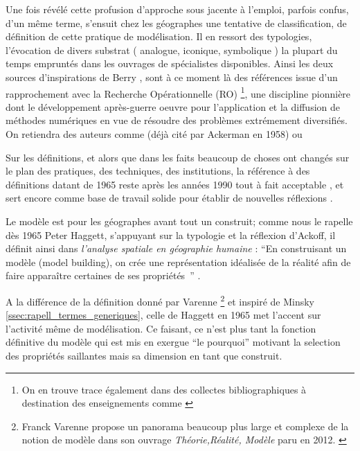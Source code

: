 Une fois révélé cette profusion d'approche sous jacente à l'emploi, parfois confus, d'un même terme, s'ensuit chez les géographes une tentative de classification, de définition de cette pratique de modélisation. Il en ressort des typologies, l'évocation de divers substrat ( analogue, iconique, symbolique ) la plupart du temps empruntés dans les ouvrages de spécialistes disponibles. Ainsi les deux sources d'inspirations de Berry \autocite[106]{Berry1963}, \autocite{Haggett1965} sont à ce moment là des références issue d'un rapprochement avec la Recherche Opérationnelle (RO) \footnote{On en trouve trace également dans des collectes bibliographiques à destination des enseignements comme \autocite{Greer1972}}, une discipline pionnière dont le développement après-guerre oeuvre pour l'application et la diffusion de méthodes numériques en vue de résoudre des problèmes extrémement diversifiés. On retiendra des auteurs comme \textcite{Ackoff1962} (déjà cité par Ackerman en 1958) ou \textcite{Kemeny1962}


Sur les définitions, et alors que dans les faits beaucoup de choses ont changés sur le plan des pratiques, des techniques, des institutions, la référence à des définitions datant de 1965 reste après les années 1990 tout à fait acceptable \cites{Dastes2001, Antony2013}[295]{Bailly1995}, et sert encore comme base de travail solide pour établir de nouvelles réflexions \autocite{Brunet2000}. 

Le modèle est pour les géographes avant tout un construit; comme nous le rapelle dès 1965 Peter Haggett, s'appuyant sur la typologie et la réflexion d'Ackoff, il définit ainsi dans \textit{l'analyse spatiale en géographie humaine} : \enquote{En construisant un modèle (model building), on crée une représentation idéalisée de la réalité afin de faire apparaître certaines de ses propriétés } \autocite[30]{Haggett1965}. 

A la différence de la définition donné par Varenne \footnote{Franck Varenne propose un panorama beaucoup plus large et complexe de la notion de modèle dans son ouvrage \textit{Théorie,Réalité, Modèle} paru en 2012. \autocite{Varenne2012}} et inspiré de Minsky \ref{ssec:rapell_termes_generiques}, celle de Haggett en 1965 met l'accent sur l'activité même de modélisation. Ce faisant, ce n'est plus tant la fonction définitive du modèle qui est mis en exergue { \enquote{le pourquoi} motivant la selection des propriétés saillantes} mais sa dimension en tant que construit.

